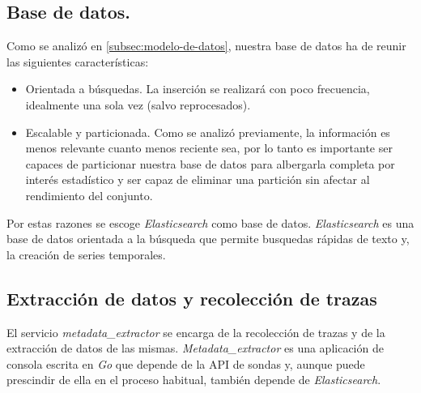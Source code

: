 \subsection{Base de datos.}

Como se analizó en \ref{subsec:modelo-de-datos}, nuestra base de datos ha de reunir las siguientes características:

\begin{itemize}
    \item Orientada a búsquedas. La inserción se realizará con poco frecuencia, idealmente una sola vez (salvo reprocesados).
    \item Escalable y particionada. Como se analizó previamente, la información es menos relevante cuanto menos reciente sea, por lo tanto es importante
    ser capaces de particionar nuestra base de datos para albergarla completa por interés estadístico y ser capaz de eliminar una partición sin afectar al rendimiento del conjunto.
\end{itemize}

Por estas razones se escoge \emph{Elasticsearch} como base de datos. \emph{Elasticsearch} es una base de datos orientada a la búsqueda que permite
busquedas rápidas de texto y, la creación de series temporales.


\subsection{Extracción de datos y recolección de trazas}
\label{subsec:extraccion-trazas}

El servicio \emph{metadata\_extractor} se encarga de la recolección de trazas y de la extracción de datos de las mismas.
\emph{Metadata\_extractor} es una aplicación de consola escrita en \emph{Go} que depende de la API de sondas y, aunque puede prescindir de ella
en el proceso habitual, también depende de \emph{Elasticsearch}.

